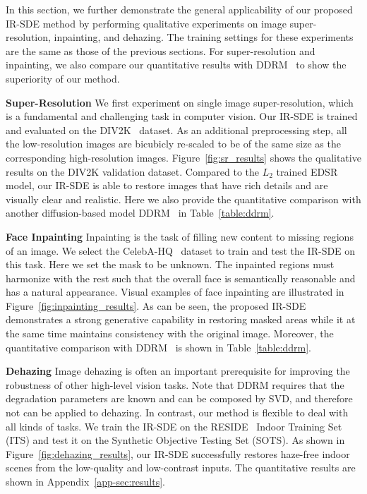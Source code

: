 \documentclass{article}
\newcommand{\parsection}[1]{\textbf{#1 }}
\theoremstyle{plain}
\theoremstyle{definition}
\theoremstyle{remark}
\begin{document}
In this section, we further demonstrate the general applicability of our proposed IR-SDE method by performing qualitative experiments on image super-resolution, inpainting, and dehazing. The training settings for these experiments are the same as those of the previous sections. For super-resolution and inpainting, we also compare our quantitative results with DDRM~\cite{kawar2022denoising} to show the superiority of our method.



\parsection{Super-Resolution}
We first experiment on single image super-resolution, which is a fundamental and challenging task in computer vision. Our IR-SDE is trained and evaluated on the DIV2K~\cite{agustsson2017ntire} dataset. As an additional preprocessing step, all the low-resolution images are bicubicly re-scaled to be of the same size as the corresponding high-resolution images. Figure~\ref{fig:sr_results} shows the qualitative results on the DIV2K validation dataset. Compared to the $L_2$ trained EDSR~\cite{lim2017enhanced} model, our IR-SDE is able to restore images that have rich details and are visually clear and realistic. Here we also provide the quantitative comparison with another diffusion-based model DDRM~\cite{kawar2022denoising} in Table~\ref{table:ddrm}.





\parsection{Face Inpainting}
Inpainting is the task of filling new content to missing regions of an image. We select the CelebA-HQ~\cite{karras2018progressive} dataset to train and test the IR-SDE on this task. Here we set the mask to be unknown. The inpainted regions must harmonize with the rest such that the overall face is semantically reasonable and has a natural appearance. Visual examples of face inpainting are illustrated in Figure~\ref{fig:inpainting_results}. As can be seen, the proposed IR-SDE demonstrates a strong generative capability in restoring masked areas while it at the same time maintains consistency with the original image. Moreover, the quantitative comparison with DDRM~\cite{kawar2022denoising} is shown in Table~\ref{table:ddrm}.




\parsection{Dehazing}
Image dehazing is often an important prerequisite for improving the robustness of other high-level vision tasks. Note that DDRM requires that the degradation parameters are known and can be composed by SVD, and therefore not can be applied to dehazing. In contrast, our method is flexible to deal with all kinds of tasks. We train the IR-SDE on the RESIDE~\cite{li2018benchmarking} Indoor Training Set (ITS) and test it on the Synthetic Objective Testing Set (SOTS). As shown in Figure~\ref{fig:dehazing_results}, our IR-SDE successfully restores haze-free indoor scenes from the low-quality and low-contrast inputs. The quantitative results are shown in Appendix~\ref{app-sec:results}.
\end{document}

